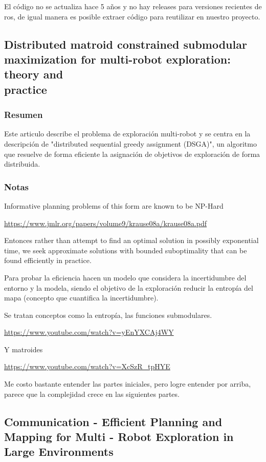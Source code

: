 El código no se actualiza hace 5 años y no hay releases para versiones recientes de ros, de igual manera es posible extraer código para reutilizar en nuestro proyecto.

\subsection[Distributed matroid constrained submodular maximization for multi-robot exploration: theory and practice]{Distributed matroid constrained submodular maximization for multi-robot exploration: theory and\\ practice}
\subsubsection{Resumen}
Este articulo describe el problema de exploración multi-robot y se centra en la descripción de "distributed sequential greedy assignment (DSGA)", un algoritmo que resuelve de forma eficiente la asignación de objetivos de exploración de forma distribuida.

\subsubsection{Notas}
Informative planning problems of this form are known to be NP-Hard 

\url{https://www.jmlr.org/papers/volume9/krause08a/krause08a.pdf}

Entonces rather than attempt to find an optimal solution in possibly exponential time, we seek approximate solutions with bounded suboptimality that can be found efficiently in practice.

Para probar la eficiencia hacen un modelo que considera la incertidumbre del entorno y la modela, siendo el objetivo de la exploración reducir la entropía del mapa (concepto que cuantifica la incertidumbre).

Se tratan conceptos como la entropía, las funciones submodulares.

\url{https://www.youtube.com/watch?v=yEnYXCAj4WY}

Y matroides

\url{https://www.youtube.com/watch?v=XcSzR_tpHYE}

Me costo bastante entender las partes iniciales, pero logre entender por arriba, parece que la complejidad crece en las siguientes partes.

\subsection{Communication - Efficient Planning and Mapping for Multi - Robot Exploration in Large Environments}
